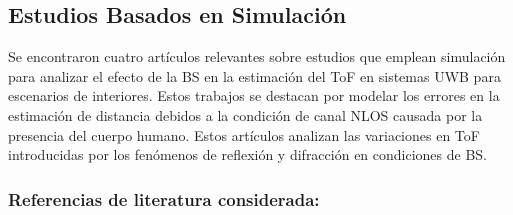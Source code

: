 \subsection{Estudios Basados en Simulación}

Se encontraron cuatro artículos relevantes sobre estudios que emplean simulación para analizar el efecto de la BS en la estimación del ToF en sistemas UWB para escenarios de interiores. Estos trabajos se destacan por modelar los errores en la estimación de distancia debidos a la condición de canal NLOS causada por la presencia del cuerpo humano. Estos artículos analizan las variaciones en ToF introducidas por los fenómenos de reflexión y difracción  en condiciones de BS. %

\subsubsection{Referencias de literatura considerada:}
%
